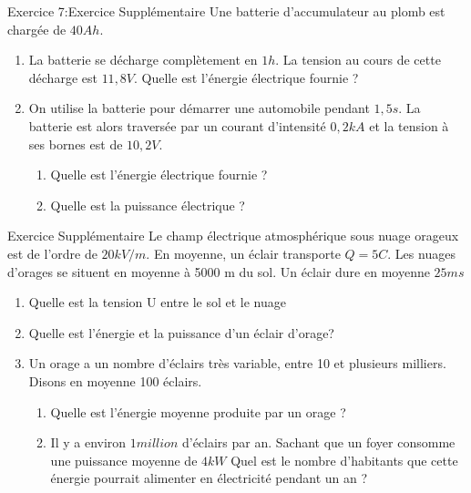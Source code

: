 \documentclass[12pt, french]{article}
\begin{document}
\begin{Box2}{Exercice 7:Exercice Supplémentaire   }
Une batterie d’accumulateur au plomb est chargée de $40 Ah$.
   \begin{enumerate}
   \item La batterie se décharge complètement en $1 h$. La tension au cours de cette décharge est $11,8 V$. Quelle est
l’énergie électrique fournie ?
\item On utilise la batterie pour démarrer une automobile pendant $1,5 s$. La batterie est alors traversée par un
courant d’intensité $0,2 kA$ et la tension à ses bornes est de $10,2 V$.
         \begin{enumerate}
            \item Quelle est l’énergie électrique fournie ?
            \item Quelle est la puissance électrique ?
         \end{enumerate}
   \end{enumerate}
\end{Box2}

\begin{Box2}{Exercice Supplémentaire }
Le champ électrique atmosphérique sous nuage orageux est de l'ordre de $20kV/m$. En moyenne, un éclair
transporte $Q=5 C$. Les nuages d’orages se situent en moyenne à 5000 m du sol.
Un éclair dure en moyenne $25ms$
   \begin{enumerate}

   \item Quelle est la tension U entre le sol et le nuage
   \item Quelle est l’énergie et la puissance d'un éclair d'orage?
   \item Un orage a un nombre d'éclairs très variable, entre 10 et plusieurs milliers. Disons en moyenne 100 éclairs.
      \begin{enumerate}
            \item Quelle est l'énergie moyenne produite par un orage ?
\item Il y a environ $1 million$ d'éclairs par an. Sachant que un foyer consomme une puissance moyenne de $4 kW$
Quel est le nombre d'habitants que cette énergie pourrait alimenter en électricité pendant un an ?
      \end{enumerate}
   \end{enumerate}
\end{Box2}


\vspace{2cm}
\begin{center}
   \Large{ \em{}}
\end{center}



\end{document}
